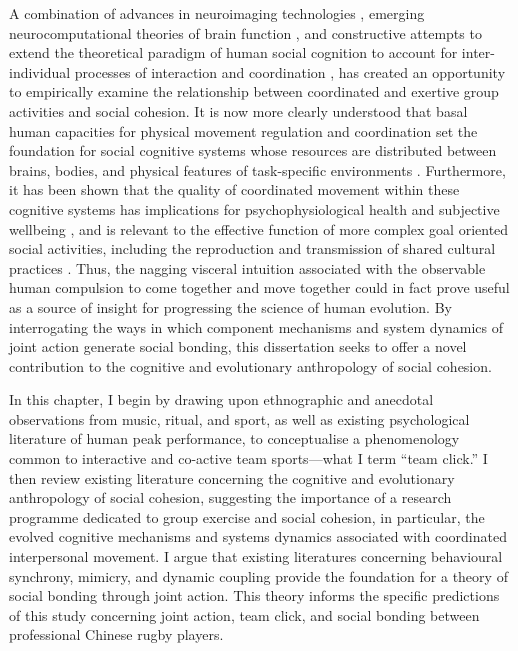 A combination of advances in neuroimaging technologies \citep{Frith2007}, emerging neurocomputational theories of brain function \citep{Friston2010,Frith2010,Clark2013}, and constructive attempts to extend the theoretical paradigm of human social cognition to account for inter-individual processes of interaction and coordination \citep{Sebanz2006,Dale2014}, has created an opportunity to empirically examine the relationship between coordinated and exertive group activities and social cohesion.  It is now more clearly understood that basal human capacities for physical movement regulation and coordination set the foundation for social cognitive systems whose resources are distributed between brains, bodies, and physical features of task-specific environments \citep{Hutchins2000,Kirsh2006,Semin2008,Semin2012,Coey2012}.
Furthermore, it has been shown that the quality of coordinated movement within these cognitive systems has implications for psychophysiological health and subjective wellbeing \citep{Wheatley2012}, and is relevant to the effective function of more complex goal oriented social activities, including the reproduction and transmission of shared cultural practices \citep{Dunbar2012,Roepstorff2010,Claidiere2014,Launay2016}. Thus, the nagging visceral intuition associated with the observable human compulsion to come together and move together could in fact prove useful as a source of insight for progressing the science of human evolution.  By interrogating the ways in which component mechanisms and system dynamics of joint action generate social bonding, this dissertation seeks to offer a novel contribution to the cognitive and evolutionary anthropology of social cohesion.

In this chapter, I begin by drawing upon ethnographic and anecdotal observations from music, ritual, and sport, as well as existing psychological literature of human peak performance, to conceptualise a phenomenology common to interactive and co-active team sports---what I term  ``team click.''  I then review existing literature concerning the cognitive and evolutionary anthropology of social cohesion, suggesting the importance of a research programme dedicated to group exercise and social cohesion, in particular, the evolved cognitive mechanisms and systems dynamics associated with coordinated interpersonal movement.  I argue that existing literatures concerning behavioural synchrony, mimicry, and dynamic coupling provide the foundation for a theory of social bonding through joint action. This theory informs the specific predictions of this study concerning joint action, team click, and social bonding between professional Chinese rugby players.
\clearpage

